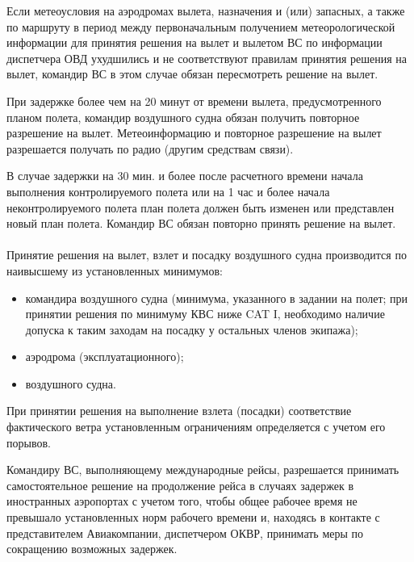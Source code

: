 
Если метеоусловия на аэродромах вылета, назначения и (или) запасных, а также по маршруту в период между первоначальным получением метеорологической информации для принятия решения на вылет и вылетом ВС по информации диспетчера ОВД ухудшились и не соответствуют правилам принятия решения на вылет, командир ВС в этом случае обязан пересмотреть решение на вылет.

При задержке более чем на 20 минут от времени вылета, предусмотренного планом полета, командир воздушного судна обязан получить повторное разрешение на вылет. Метеоинформацию и повторное разрешение на вылет разрешается получать по радио (другим средствам связи).

В случае задержки на 30 мин. и более после расчетного времени начала выполнения контролируемого полета или на 1 час и более начала неконтролируемого полета план полета должен быть изменен или представлен новый план полета. Командир ВС обязан повторно принять решение на вылет.

\paragraph{} Принятие решения на вылет, взлет и посадку воздушного судна производится по наивысшему из установленных минимумов:  
\begin{itemize}
    \item командира воздушного судна (минимума, указанного в задании на полет; при принятии решения по минимуму КВС ниже CAT I, необходимо наличие допуска к таким заходам на посадку у остальных членов экипажа);
    \item аэродрома (эксплуатационного);
    \item воздушного судна.
\end{itemize}

При принятии решения на выполнение взлета (посадки) соответствие фактического ветра установленным ограничениям определяется с учетом его порывов.

Командиру ВС, выполняющему международные рейсы, разрешается принимать самостоятельное решение на продолжение рейса в случаях задержек в иностранных аэропортах с учетом того, чтобы общее рабочее время не превышало установленных норм рабочего времени и, находясь в контакте с представителем Авиакомпании, диспетчером ОКВР, принимать меры по сокращению возможных задержек.


